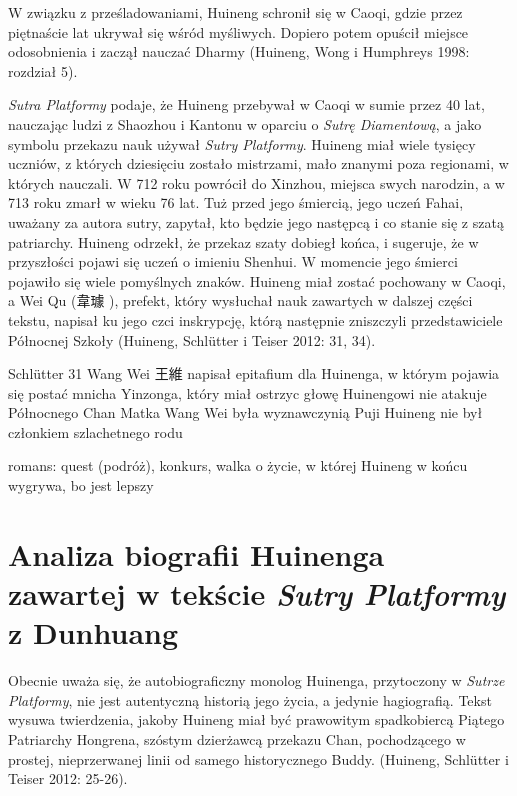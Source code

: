 W związku z prześladowaniami, Huineng schronił się w Caoqi, gdzie przez piętnaście lat ukrywał się wśród myśliwych. Dopiero potem opuścił miejsce odosobnienia i zaczął nauczać Dharmy (Huineng, Wong i Humphreys 1998: rozdział 5).

\textit{Sutra Platformy} podaje, że Huineng przebywał w Caoqi w sumie przez 40 lat, nauczając ludzi z Shaozhou i Kantonu w oparciu o \textit{Sutrę Diamentową}, a jako symbolu przekazu nauk używał \textit{Sutry Platformy}. Huineng miał wiele tysięcy uczniów, z których dziesięciu zostało mistrzami, mało znanymi poza regionami, w których nauczali. W 712 roku powrócił do Xinzhou, miejsca swych narodzin, a w 713 roku zmarł w wieku 76 lat. Tuż przed jego śmiercią, jego uczeń Fahai, uważany za autora sutry, zapytał, kto będzie jego następcą i co stanie się z szatą patriarchy. Huineng odrzekł, że przekaz szaty dobiegł końca, i sugeruje, że w przyszłości pojawi się uczeń o imieniu Shenhui. W momencie jego śmierci pojawiło się wiele pomyślnych znaków. Huineng miał zostać pochowany w Caoqi, a Wei Qu (韋璩 ), prefekt, który wysłuchał nauk zawartych w dalszej części tekstu, napisał ku jego czci inskrypcję, którą następnie zniszczyli przedstawiciele Północnej Szkoły (Huineng, Schlütter i Teiser 2012: 31, 34).

Schlütter 31
Wang Wei 王維 napisał epitafium dla Huinenga, w którym pojawia się postać mnicha Yinzonga, który miał ostrzyc głowę Huinengowi
nie atakuje Północnego Chan
Matka Wang Wei była wyznawczynią Puji
Huineng nie był członkiem szlachetnego rodu

romans: quest (podróż), konkurs, walka o życie, w której Huineng w końcu wygrywa, bo jest lepszy

\fi

\section{Analiza biografii Huinenga zawartej w tekście \textit{Sutry Platformy} z Dunhuang}
Obecnie uważa się, że autobiograficzny monolog Huinenga, przytoczony w \textit{Sutrze Platformy}, nie jest autentyczną historią jego życia, a jedynie hagiografią. Tekst wysuwa twierdzenia, jakoby Huineng miał być prawowitym spadkobiercą Piątego Patriarchy Hongrena, szóstym dzierżawcą przekazu Chan, pochodzącego w prostej, nieprzerwanej linii od samego historycznego Buddy. (Huineng, Schlütter i Teiser 2012: 25-26). %

